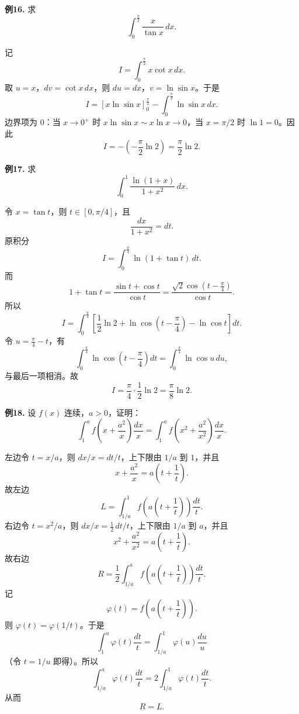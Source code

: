 \begin{problemblock}
\textbf{例16.} 求
\[
\int_0^{\frac\pi2}\frac{x}{\tan x}\,dx.
\]
\end{problemblock}
\begin{solutionblock}
记
\[
I=\int_0^{\frac\pi2}x\cot x\,dx.
\]
取 \(u=x\)，\(dv=\cot x\,dx\)，则 \(du=dx\)，\(v=\ln\sin x\)。于是
\[
I=\left[x\ln\sin x\right]_0^{\frac\pi2}
-\int_0^{\frac\pi2}\ln\sin x\,dx.
\]
边界项为 \(0\)：当 \(x\to0^+\) 时 \(x\ln\sin x\sim x\ln x\to0\)，当 \(x=\pi/2\) 时 \(\ln1=0\)。因此
\[
I=-\left(-\frac\pi2\ln2\right)
=\frac\pi2\ln2.
\]
\end{solutionblock}

\begin{problemblock}
\textbf{例17.} 求
\[
\int_0^1\frac{\ln(1+x)}{1+x^2}\,dx.
\]
\end{problemblock}
\begin{solutionblock}
令 \(x=\tan t\)，则 \(t\in[0,\pi/4]\)，且
\[
\frac{dx}{1+x^2}=dt.
\]
原积分
\[
I=\int_0^{\frac\pi4}\ln(1+\tan t)\,dt.
\]
而
\[
1+\tan t=\frac{\sin t+\cos t}{\cos t}
=\frac{\sqrt2\cos\left(t-\frac\pi4\right)}{\cos t}.
\]
所以
\[
I=\int_0^{\frac\pi4}
\left[\frac12\ln2+\ln\cos\left(t-\frac\pi4\right)-\ln\cos t\right]dt.
\]
令 \(u=\frac\pi4-t\)，有
\[
\int_0^{\frac\pi4}\ln\cos\left(t-\frac\pi4\right)dt
=\int_0^{\frac\pi4}\ln\cos u\,du,
\]
与最后一项相消。故
\[
I=\frac\pi4\cdot\frac12\ln2=\frac\pi8\ln2.
\]
\end{solutionblock}

\begin{problemblock}
\textbf{例18.} 设 \(f(x)\) 连续，\(a>0\)，证明：
\[
\int_1^a f\left(x+\frac{a^2}{x}\right)\frac{dx}{x}
=
\int_1^a f\left(x^2+\frac{a^2}{x^2}\right)\frac{dx}{x}.
\]
\end{problemblock}
\begin{solutionblock}
左边令 \(t=x/a\)，则 \(dx/x=dt/t\)，上下限由 \(1/a\) 到 \(1\)，并且
\[
x+\frac{a^2}{x}=a\left(t+\frac1t\right).
\]
故左边
\[
L=\int_{1/a}^{1}f\left(a\left(t+\frac1t\right)\right)\frac{dt}{t}.
\]
右边令 \(t=x^2/a\)，则 \(dx/x=\frac12\,dt/t\)，上下限由 \(1/a\) 到 \(a\)，并且
\[
x^2+\frac{a^2}{x^2}=a\left(t+\frac1t\right).
\]
故右边
\[
R=\frac12\int_{1/a}^{a}f\left(a\left(t+\frac1t\right)\right)\frac{dt}{t}.
\]
记
\[
\varphi(t)=f\left(a\left(t+\frac1t\right)\right).
\]
则 \(\varphi(t)=\varphi(1/t)\)。于是
\[
\int_1^a\varphi(t)\frac{dt}{t}
=\int_{1/a}^{1}\varphi(u)\frac{du}{u}
\]
（令 \(t=1/u\) 即得）。所以
\[
\int_{1/a}^{a}\varphi(t)\frac{dt}{t}
=2\int_{1/a}^{1}\varphi(t)\frac{dt}{t}.
\]
从而
\[
R=L.
\]
\end{solutionblock}

